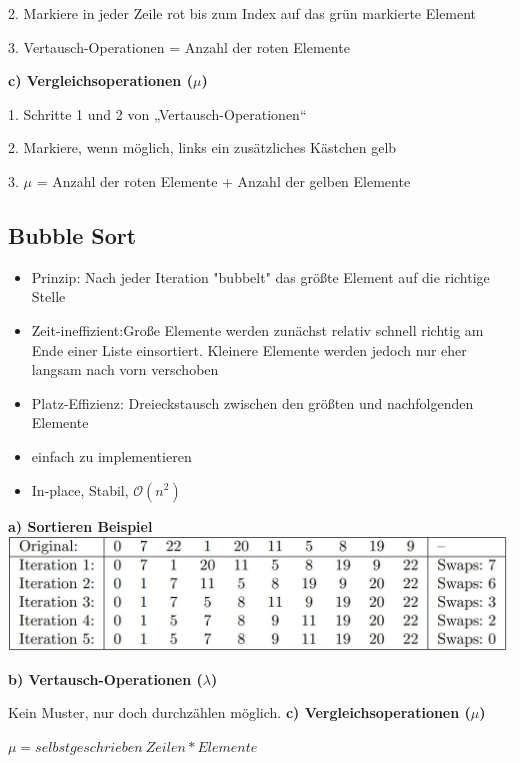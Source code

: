 \documentclass[12pt]{article}
\begin{document}
	2.	Markiere in jeder Zeile rot bis zum Index auf das grün markierte Element
	
	3.	Vertausch-Operationen = Anzahl der roten Elemente\hfill \break
	
	\textbf{c) Vergleichsoperationen ($\mu$)} \hfill \break
	
	1.	Schritte 1 und 2 von „Vertausch-Operationen“
	
	2.	Markiere, wenn möglich, links ein zusätzliches Kästchen gelb
	
	3.	$\mu$ = Anzahl der roten Elemente + Anzahl der gelben Elemente
	
	\newpage
	
	\subsection{Bubble Sort}
	\begin{itemize}
		\item Prinzip: Nach jeder Iteration "bubbelt" das größte Element auf die richtige Stelle
		\item Zeit-ineffizient:Große Elemente werden zunächst relativ schnell richtig am Ende einer Liste einsortiert. Kleinere Elemente werden jedoch nur eher langsam nach vorn verschoben
		\item Platz-Effizienz: Dreieckstausch zwischen den größten und nachfolgenden Elemente
		\item einfach zu implementieren 
		\item In-place, Stabil, $ \mathcal{O}(n^2) $ 
	\end{itemize}
	\textbf{a) Sortieren Beispiel}
	\newline\newline
	\includegraphics[scale=0.5]{BubbleSort}
	\newline
	
	\textbf{b) Vertausch-Operationen ($\lambda$)} \hfill \break
	
	Kein Muster, nur doch durchzählen möglich. \hfill \break
	\newline
	\textbf{c) Vergleichsoperationen ($\mu$)}
	

		\begin{center}
		$\mu = selbst geschrieben \ Zeilen * Elemente$
	\end{center}
\newpage
\end{document}
